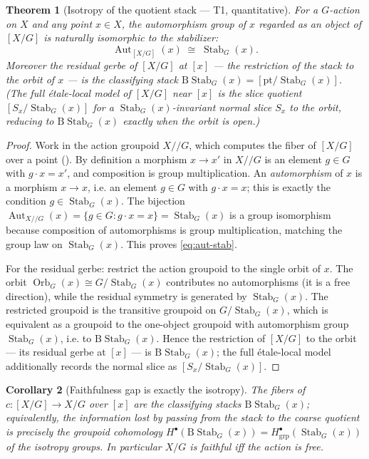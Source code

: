 \documentclass[12pt]{article}
\newtheorem{theorem}{Theorem}[section]
\newtheorem{corollary}[theorem]{Corollary}
\theoremstyle{definition}
\theoremstyle{remark}
\newcommand{\Aut}{\operatorname{Aut}}
\newcommand{\Stab}{\operatorname{Stab}}
\newcommand{\Orb}{\operatorname{Orb}}
\newcommand{\quot}[2]{[#1/#2]}
\begin{document}
\begin{theorem}[Isotropy of the quotient stack --- T1, quantitative]
\label{thm:aut-stab}
For a $G$-action on $X$ and any point $x\in X$, the automorphism group of $x$ regarded
as an object of $\quot{X}{G}$ is naturally isomorphic to the stabilizer:
\begin{equation}
\Aut_{\quot{X}{G}}(x)\;\cong\;\Stab_G(x).
\label{eq:aut-stab}
\end{equation}
Moreover the \emph{residual gerbe} of $\quot{X}{G}$ at $[x]$ --- the restriction of the
stack to the orbit of $x$ --- is the classifying stack
$\mathrm{B}\Stab_G(x)=\quot{\mathrm{pt}}{\Stab_G(x)}$. (The full \'etale-local model of
$\quot{X}{G}$ near $[x]$ is the slice quotient $\quot{S_x}{\Stab_G(x)}$ for a
$\Stab_G(x)$-invariant normal slice $S_x$ to the orbit, reducing to
$\mathrm{B}\Stab_G(x)$ exactly when the orbit is open.)
\end{theorem}

\begin{proof}
Work in the action groupoid $X/\!\!/G$, which computes the fiber of $\quot{X}{G}$ over a
point (). By definition a morphism $x\to x'$ in $X/\!\!/G$ is an
element $g\in G$ with $g\cdot x = x'$, and composition is group multiplication. An
\emph{automorphism} of $x$ is a morphism $x\to x$, i.e. an element $g\in G$ with
$g\cdot x = x$; this is exactly the condition $g\in\Stab_G(x)$. The bijection
$\Aut_{X/\!\!/G}(x)=\{g\in G: g\cdot x=x\}=\Stab_G(x)$ is a group isomorphism because
composition of automorphisms is group multiplication, matching the group law on
$\Stab_G(x)$. This proves \eqref{eq:aut-stab}.

For the residual gerbe: restrict the action groupoid to the single orbit of $x$. The
orbit $\Orb_G(x)\cong G/\Stab_G(x)$ contributes no automorphisms (it is a free
direction), while the residual symmetry is generated by $\Stab_G(x)$. The restricted
groupoid is the transitive groupoid on $G/\Stab_G(x)$, which is equivalent as a groupoid
to the one-object groupoid with automorphism group $\Stab_G(x)$, i.e. to
$\mathrm{B}\Stab_G(x)$. Hence the restriction of $\quot{X}{G}$ to the orbit --- its
residual gerbe at $[x]$ --- is $\mathrm{B}\Stab_G(x)$; the full \'etale-local model
additionally records the normal slice as $\quot{S_x}{\Stab_G(x)}$.
\end{proof}

\begin{corollary}[Faithfulness gap is exactly the isotropy]
\label{cor:faithfulness}
The fibers of $c:\quot{X}{G}\to X/G$ over $[x]$ are the classifying stacks
$\mathrm{B}\Stab_G(x)$; equivalently, the information lost by passing from the stack to
the coarse quotient is precisely the groupoid cohomology
$H^\bullet(\mathrm{B}\Stab_G(x))=H^\bullet_{\mathrm{grp}}(\Stab_G(x))$ of the isotropy
groups. In particular $X/G$ is faithful iff the action is free.
\end{corollary}
\end{document}
